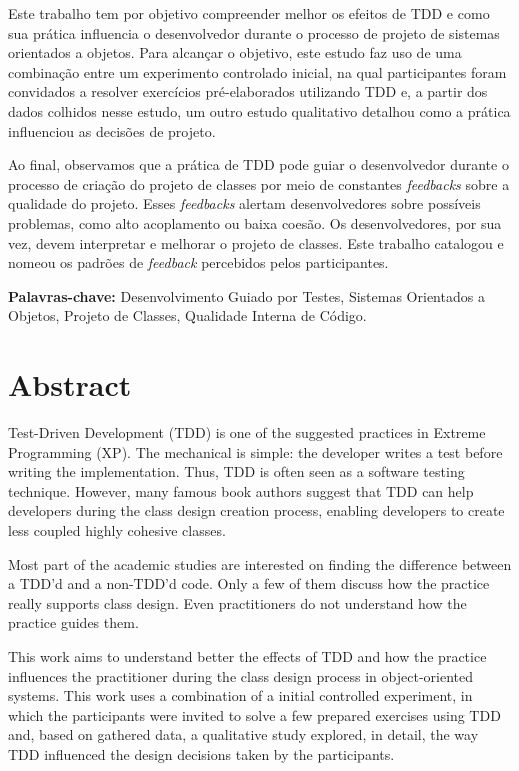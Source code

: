 \documentclass[11pt,openany,twoside,a4paper]{book}
\begin{document}
Este trabalho tem por objetivo compreender melhor os efeitos de TDD e como sua prática 
influencia o desenvolvedor durante o processo de projeto de sistemas orientados a objetos.
Para alcançar o objetivo, este estudo faz uso de uma combinação entre um experimento controlado 
inicial, na qual participantes foram
convidados a resolver exercícios pré-elaborados utilizando TDD e, a partir dos dados colhidos nesse estudo, um outro
estudo qualitativo detalhou como a prática influenciou as decisões de projeto.

Ao final, observamos que a prática de TDD pode guiar o desenvolvedor durante o processo
de criação do projeto de classes por meio de constantes \textit{feedbacks} sobre a qualidade
do projeto. Esses \textit{feedbacks} alertam desenvolvedores sobre possíveis problemas,
como alto acoplamento ou baixa coesão. Os desenvolvedores, por sua vez, devem interpretar
e melhorar o projeto de classes. Este trabalho catalogou e nomeou os padrões de
\textit{feedback} percebidos pelos participantes.

\noindent \textbf{Palavras-chave:} Desenvolvimento Guiado por Testes, Sistemas Orientados
a Objetos, Projeto de Classes, Qualidade Interna de Código.

\chapter*{Abstract}

Test-Driven Development (TDD) is one of the suggested practices in Extreme
Programming (XP). The mechanical is simple: the developer writes a test before
writing the implementation. Thus, TDD is often seen as
a software testing technique. However, many famous book authors suggest that
TDD can help developers during the class design creation
process, enabling developers to create less coupled highly cohesive classes.

Most part of the academic studies are interested on finding the difference between
a TDD'd and a non-TDD'd code. Only a few of them discuss how the practice
really supports class design. Even practitioners
do not understand how the practice guides them.

This work aims to understand better the effects of TDD and how the practice influences the
practitioner during the class design process in object-oriented systems. 
This work uses a combination of a initial controlled experiment, in which the participants
were invited to solve a few prepared exercises using TDD and, based on gathered data,
a qualitative study explored, in detail, the way TDD influenced the design decisions
taken by the participants.
\end{document}
